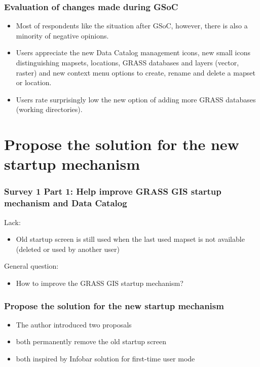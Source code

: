\documentclass[aspectratio=169]{beamer}
\begin{document}
\begin{frame}
\frametitle{Evaluation of changes made during GSoC}

\begin{itemize}
\item Most of respondents like the situation after GSoC, however, there is also a minority of negative opinions.
\vspace{0.5cm}
\item Users appreciate the new Data Catalog management icons,  new small icons distinguishing mapsets, locations, GRASS
databases and layers (vector, raster) and new context menu options to create, rename and delete a mapset or location.
\vspace{0.5cm}
\item Users rate surprisingly low the new option of adding more GRASS databases (working directories).
\end{itemize}
\end{frame}

\section{Propose the solution for the new startup mechanism}

\begin{frame}
\frametitle{Survey 1 Part 1: Help improve GRASS GIS startup mechanism and Data Catalog}
Lack:
\begin{itemize}
\item  Old startup screen is still used when the last used mapset is not available (deleted or used by another user)
\end{itemize}

\vspace{0.5cm}
General question:
\begin{itemize}
\item How to improve the GRASS GIS startup mechanism?
\end{itemize}
\end{frame}

\begin{frame}
\frametitle{Propose the solution for the new startup mechanism}
\begin{itemize}
\item The author introduced two proposals
\vspace{0.5cm}
\item both permanently remove the old startup screen
\vspace{0.5cm}
\item both inspired by Infobar solution for first-time user mode
\end{itemize}
\end{frame}
\end{document}

